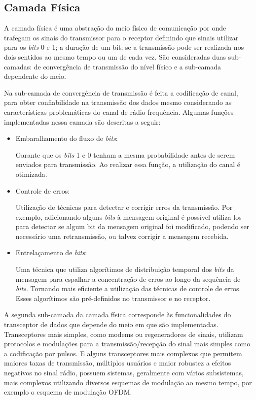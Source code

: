 \subsection{Camada Física}
A camada física é uma abstração do meio físico de comunicação por onde trafegam os sinais do transmissor para o receptor definindo que sinais utilizar para os \emph{bits} 0 e 1; a duração de um bit; se a transmissão pode ser realizada nos dois sentidos ao mesmo tempo ou um de cada vez. São consideradas duas sub-camadas: de convergência de transmissão do nível físico e a sub-camada dependente do meio.

Na sub-camada de convergência de transmissão é feita a codificação de canal, para obter confiabilidade na transmissão dos dados mesmo considerando as características problemáticas do canal de rádio frequência. Algumas funções implementadas nessa camada são descritas a seguir:
\begin{itemize}
      \item Embaralhamento do fluxo de \emph{bits}:

            Garante que os \emph{bits} 1 e 0 tenham a mesma probabilidade antes de serem enviados para transmissão. Ao realizar essa função, a utilização do canal é otimizada.
      \item Controle de erros:

            Utilização de técnicas para detectar e corrigir erros da transmissão. Por exemplo, adicionando alguns \emph{bits} à mensagem original é possível utiliza-los para detectar se algum bit da mensagem original foi modificado, podendo ser necessário uma retransmissão, ou talvez corrigir a mensagem recebida.
      \item Entrelaçamento de \emph{bits}:

            Uma técnica que utiliza algorítimos de distribuição temporal dos \emph{bits} da mensagem para espalhar a concentração de erros ao longo da sequência de \emph{bits}. Tornando mais eficiente a utilização das técnicas de controle de erros. Esses algorítimos são pré-definidos no transmissor e no receptor.
\end{itemize}

A segunda sub-camada da camada física corresponde às funcionalidades do transceptor de dados que depende do meio em que são implementadas. Transceptores mais simples, como modems ou regeneradores de sinais, utilizam protocolos e modulações para a transmissão/recepção do sinal mais simples como a codificação por pulsos. E alguns transceptores mais complexos que permitem maiores taxas de transmissão, múltiplos usuários e maior robustez a efeitos negativos no sinal rádio, possuem sistemas, geralmente com vários subsistemas, mais complexos utilizando diversos esquemas de modulação ao mesmo tempo, por exemplo o esquema de modulação OFDM.


